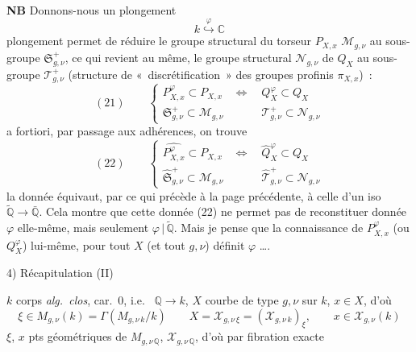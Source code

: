 \documentclass[11pt,a4paper]{article}
\begin{document}
\textbf{NB} Donnons-nous un plongement
\[
  k\overset{\varphi}{\hookrightarrow}\mathbb{C}
\]
  plongement permet de réduire le groupe
structural du torseur $P_{X,x}$ \struck{\ill{}} 
$\mathcal{M}_{g,\nu}$ au sous-groupe $\mathfrak{S}^{+}_{g,\nu}$, ce qui
revient au même, le groupe structural $\mathcal{N}_{g,\nu}$ de $Q_X$ au
sous-groupe $\mathcal{T}^{+}_{g,\nu}$ (structure de «~discrétification~»
 des groupes profinis $\pi_{X,x}$)~:
\[
  (21)\qquad
  \begin{cases}
    P^{\varphi}_{X,x}\subset P_{X,x}
      &\Longleftrightarrow\quad Q^{\varphi}_X\subset Q_X\\
    \mathfrak{S}^{+}_{g,\nu}\subset\mathcal{M}_{g,\nu}
      &\phantom{\Longleftrightarrow}\quad \mathcal{T}^{+}_{g,\nu}\subset\mathcal{N}_{g,\nu}
  \end{cases}
\]
a fortiori, par passage aux adhérences, on trouve
\[
  (22)\qquad
  \begin{cases}
    \widehat{P^{\varphi}_{X,x}}\subset P_{X,x}
      &\Longleftrightarrow\quad \hat{Q}^{\varphi}_X\subset Q_X\\
    \hat{\mathfrak{S}}^{+}_{g,\nu}\subset\mathcal{M}_{g,\nu}
      &\phantom{\Longleftrightarrow}\quad \hat{\mathcal{T}}^{+}_{g,\nu}\subset\mathcal{N}_{g,\nu}
  \end{cases}
\]
  la donnée équivaut, par ce qui précède
à la page précédente, à celle d'un iso 
$\tilde{\mathbb{Q}}\to\bar{\mathbb{Q}}$.
Cela montre que cette donnée (22) ne permet pas de reconstituer
\struck{\ill{}}  donnée $\varphi$ elle-même, mais seulement
$\varphi\,|\,\tilde{\mathbb{Q}}$. Mais je pense que la connaissance de
\struck{$\varphi$} $P^{\varphi}_{X,x}$ (ou $Q^{\varphi}_X$) lui-même,
pour tout $X$ (et tout $g,\nu$) définit $\varphi$ ….

4) Récapitulation (II)

$k$ corps \emph{alg.\ clos}, car.~0, i.e.\ \struck{\ill{}}
$\mathbb{Q}\to k$, $X$ courbe de type $g,\nu$ sur $k$, $x\in X$, d'où
\[
  \xi\in M_{g,\nu}(k)=\Gamma(M_{g,\nu\,k}/k)
  \qquad X=\mathcal{X}_{g,\nu\,\xi}=(\mathcal{X}_{g,\nu\,k})_\xi,
  \qquad x\in\mathcal{X}_{g,\nu}(k)
\]
$\xi$, $x$ pts géométriques de $M_{g,\nu\,\mathbb{Q}}$,
$\mathcal{X}_{g,\nu\,\mathbb{Q}}$, d'où par fibration exacte
\end{document}
